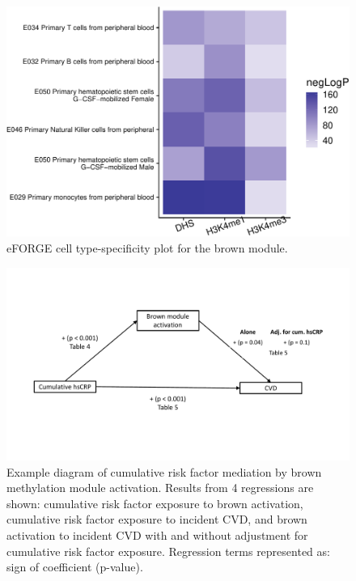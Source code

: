 \documentclass[]{article}
\begin{document}
\begin{figure}[htbp]
\centering
\includegraphics{../doc/module_ewas/figures/print-eforge-plots-1.pdf}
\caption{\label{fig:print-eforge-plots}eFORGE cell type-specificity plot for
the brown module.}
\end{figure}

\begin{figure}[htbp]
\centering
\includegraphics{../doc/module_ewas/hscrp_mediation_diagram.pdf}
\caption{\label{fig:causal-diagram-hscrp}Example diagram of cumulative risk
factor mediation by brown methylation module activation. Results from 4
regressions are shown: cumulative risk factor exposure to brown
activation, cumulative risk factor exposure to incident CVD, and brown
activation to incident CVD with and without adjustment for cumulative
risk factor exposure. Regression terms represented as: sign of
coefficient (p-value).}
\end{figure}
\end{document}

